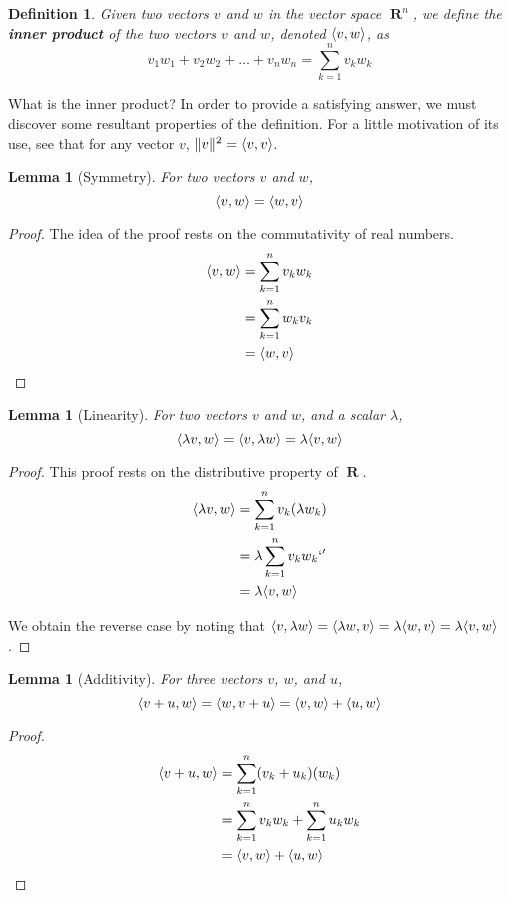 \documentclass{report}
\newtheorem{lemma}[theorem]{Lemma}
\newtheorem{definition}{Definition}
\DeclareMathOperator{\real}{\mathbf{R}}
\DeclarePairedDelimiter{\inner}{\langle}{\rangle}
\begin{document}
\begin{definition}
Given two vectors $v$ and $w$ in the vector space $\real^n$, we define the {\bf inner product} of the two vectors $v$ and $w$, denoted $\inner{v, w}$, as
%
\[ v_1w_1 + v_2w_2 + \dots + v_nw_n = \sum_{k = 1}^n v_k w_k \]
\end{definition}

What is the inner product? In order to provide a satisfying answer, we must discover some resultant properties of the definition. For a little motivation of its use, see that for any vector $v$, $\|v\|^2 = \inner{v, v}$.

\begin{lemma}[Symmetry]
  For two vectors $v$ and $w$,
  \[ \inner{v, w} = \inner{w, v} \]
\end{lemma}
\begin{proof}
  The idea of the proof rests on the commutativity of real numbers.
  \begin{align*}
    \inner{v, w} &= \sum_{k=1}^n v_k w_k\\
                 &= \sum_{k=1}^n w_k v_k\\
                 &= \inner{w, v}
  \end{align*}
\end{proof}

\begin{lemma}[Linearity]
  For two vectors $v$ and $w$, and a scalar $\lambda$,
  \[ \inner{\lambda v, w} = \inner{v, \lambda w} = \lambda \inner{v, w} \]
\end{lemma}
\begin{proof}
  This proof rests on the distributive property of $\real$.
  \begin{align*}
    \inner{\lambda v, w} &= \sum_{k = 1}^n v_k (\lambda w_k)\\
                         &= \lambda \sum_{k = 1}^n v_k w_k`'\\
                         &= \lambda \inner{v, w}
  \end{align*}

  We obtain the reverse case by noting that $\inner{v, \lambda w} = \inner{\lambda w, v} = \lambda \inner{w, v} = \lambda \inner{v, w}$.
\end{proof}

\begin{lemma}[Additivity]
  For three vectors $v$, $w$, and $u$,
  \[ \inner{v + u, w} = \inner{w, v + u} = \inner{v,w} + \inner{u,w}  \]
\end{lemma}
\begin{proof}
  \begin{align*}
    \inner{v + u, w} &= \sum_{k = 1}^n (v_k + u_k)(w_k)\\
                     &= \sum_{k = 1}^n v_kw_k + \sum_{k = 1}^n u_kw_k\\
                     &= \inner{v,w} + \inner{u,w}
  \end{align*}
\end{proof}
\end{document}
